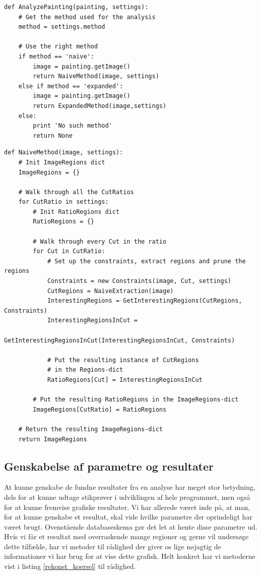 {\begin{lstlisting}[caption={Pseudokode til analyse af malerier efter
    metode}, captionpos=b, label={pseudo_naiveMethod}, frame=tb,
    breaklines=false, float=h]
def AnalyzePainting(painting, settings):
    # Get the method used for the analysis
    method = settings.method

    # Use the right method
    if method == 'naive':
        image = painting.getImage()
        return NaiveMethod(image, settings)
    else if method == 'expanded':
		image = painting.getImage()
		return ExpandedMethod(image,settings)
	else:
        print 'No such method'
        return None
\end{lstlisting}

\begin{lstlisting}[caption={Pseudokode for den naive metode},
    captionpos=b, label={pseudo_naiveMethod}, frame=tb,
    breaklines=false, float=h]
def NaiveMethod(image, settings):
    # Init ImageRegions dict
    ImageRegions = {}

    # Walk through all the CutRatios
    for CutRatio in settings:
        # Init RatioRegions dict
        RatioRegions = {}

        # Walk through every Cut in the ratio
        for Cut in CutRatio:
            # Set up the constraints, extract regions and prune the regions
            Constraints = new Constraints(image, Cut, settings)
            CutRegions = NaiveExtraction(image)
            InterestingRegions = GetInterestingRegions(CutRegions, Constraints)
            InterestingRegionsInCut =
                    GetInterestingRegionsInCut(InterestingRegionsInCut, Constraints)

            # Put the resulting instance of CutRegions
            # in the Regions-dict
            RatioRegions[Cut] = InterestingRegionsInCut

        # Put the resulting RatioRegions in the ImageRegions-dict
        ImageRegions[CutRatio] = RatioRegions

    # Return the resulting ImageRegions-dict
    return ImageRegions
\end{lstlisting}

\subsection{Genskabelse af parametre og resultater}
At kunne genskabe de fundne resultater fra en analyse har meget stor
betydning, dels for at kunne udtage stikprøver i udviklingen af hele
programmet, men også for at kunne fremvise grafiske resultater. Vi har
allerede været inde på, at man, for at kunne genskabe et resultat, skal
vide hvilke parametre der oprindeligt har været brugt. Ovenstående
databaseskema gør det let at hente disse parametre ud. Hvis vi får et
resultat med overraskende mange regioner og gerne vil undersøge dette
tilfælde, har vi metoder til rådighed der giver os lige nøjagtig de
informationer vi har brug for at vise dette grafisk. Helt konkret har vi
metoderne vist i listing \ref{rekonst_koersel} til rådighed.

}
